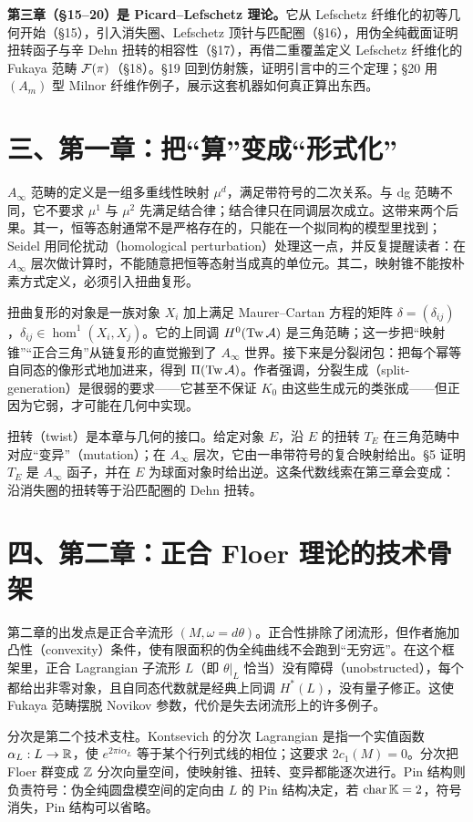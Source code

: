 \textbf{第三章（§15--20）是 Picard--Lefschetz 理论。}它从 Lefschetz 纤维化的初等几何开始（§15），引入消失圈、Lefschetz 顶针与匹配圈（§16），用伪全纯截面证明扭转函子与辛 Dehn 扭转的相容性（§17），再借二重覆盖定义 Lefschetz 纤维化的 Fukaya 范畴 $\mathcal F(\pi)$（§18）。§19 回到仿射簇，证明引言中的三个定理；§20 用 $(A_m)$ 型 Milnor 纤维作例子，展示这套机器如何真正算出东西。

\section*{三、第一章：把“算”变成“形式化”}

$A_\infty$ 范畴的定义是一组多重线性映射 $\mu^d$，满足带符号的二次关系。与 dg 范畴不同，它不要求 $\mu^1$ 与 $\mu^2$ 先满足结合律；结合律只在同调层次成立。这带来两个后果。其一，恒等态射通常不是严格存在的，只能在一个拟同构的模型里找到；Seidel 用同伦扰动（homological perturbation）处理这一点，并反复提醒读者：在 $A_\infty$ 层次做计算时，不能随意把恒等态射当成真的单位元。其二，映射锥不能按朴素方式定义，必须引入扭曲复形。

扭曲复形的对象是一族对象 $X_i$ 加上满足 Maurer--Cartan 方程的矩阵 $\delta=(\delta_{ij})$，$\delta_{ij}\in\hom^1(X_i,X_j)$。它的上同调 $H^0(\operatorname{Tw}\mathcal A)$ 是三角范畴；这一步把“映射锥”“正合三角”从链复形的直觉搬到了 $A_\infty$ 世界。接下来是分裂闭包：把每个幂等自同态的像形式地加进来，得到 $\Pi(\operatorname{Tw}\mathcal A)$。作者强调，分裂生成（split-generation）是很弱的要求——它甚至不保证 $K_0$ 由这些生成元的类张成——但正因为它弱，才可能在几何中实现。

扭转（twist）是本章与几何的接口。给定对象 $E$，沿 $E$ 的扭转 $T_E$ 在三角范畴中对应“变异”（mutation）；在 $A_\infty$ 层次，它由一串带符号的复合映射给出。§5 证明 $T_E$ 是 $A_\infty$ 函子，并在 $E$ 为球面对象时给出逆。这条代数线索在第三章会变成：沿消失圈的扭转等于沿匹配圈的 Dehn 扭转。

\section*{四、第二章：正合 Floer 理论的技术骨架}

第二章的出发点是正合辛流形 $(M,\omega=d\theta)$。正合性排除了闭流形，但作者施加凸性（convexity）条件，使有限面积的伪全纯曲线不会跑到“无穷远”。在这个框架里，正合 Lagrangian 子流形 $L$（即 $\theta|_L$ 恰当）没有障碍（unobstructed），每个都给出非零对象，且自同态代数就是经典上同调 $H^*(L)$，没有量子修正。这使 Fukaya 范畴摆脱 Novikov 参数，代价是失去闭流形上的许多例子。

分次是第二个技术支柱。Kontsevich 的分次 Lagrangian 是指一个实值函数 $\alpha_L:L\to\mathbb R$，使 $e^{2\pi i\alpha_L}$ 等于某个行列式线的相位；这要求 $2c_1(M)=0$。分次把 Floer 群变成 $\mathbb Z$ 分次向量空间，使映射锥、扭转、变异都能逐次进行。Pin 结构则负责符号：伪全纯圆盘模空间的定向由 $L$ 的 Pin 结构决定，若 $\operatorname{char}\mathbb K=2$，符号消失，Pin 结构可以省略。

